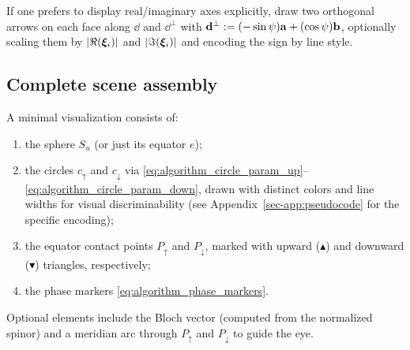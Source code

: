 If one prefers to display real/imaginary axes explicitly, draw two orthogonal arrows on each face along $\dd$ and $\dd^\perp$ with $\mathbf{d}^\perp:=(-\sin\psi)\mathbf{a}+(\cos\psi)\mathbf{b}$, optionally scaling them by $|\Re(\bm{\xi}_i)|$ and $|\Im(\bm{\xi}_i)|$ and encoding the sign by line style.

\subsection{Complete scene assembly}
A minimal visualization consists of:
\begin{enumerate}
  \item the sphere $S_u$ (or just its equator $e$);
  \item the circles $c_\uparrow$ and $c_\downarrow$ via \eqref{eq:algorithm_circle_param_up}--\eqref{eq:algorithm_circle_param_down}, drawn with distinct colors and line widths for visual discriminability (see Appendix~\ref{sec-app:pseudocode} for the specific encoding);
  \item the equator contact points $P_\uparrow$ and $P_\downarrow$, marked with upward ($\blacktriangle$) and downward ($\blacktriangledown$) triangles, respectively;
  \item the phase markers \eqref{eq:algorithm_phase_markers}.
\end{enumerate}
Optional elements include the Bloch vector (computed from the normalized spinor) and a meridian arc through $P_\uparrow$ and $P_\downarrow$ to guide the eye.
